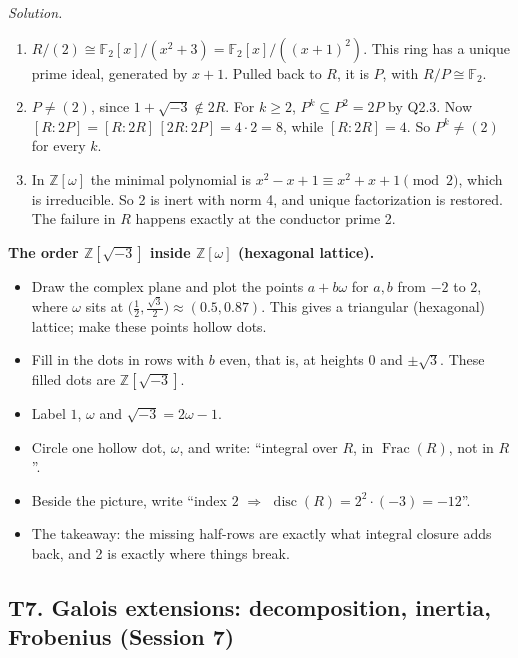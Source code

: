 \documentclass[11pt]{article}
\newcommand{\Z}{\mathbb{Z}}
\newcommand{\F}{\mathbb{F}}
\DeclareMathOperator{\disc}{disc}
\DeclareMathOperator{\Frac}{Frac}
\begin{document}
\begin{enumerate}[label=\textbf{Q6.\arabic*}]
  \textit{Solution.}
  \begin{enumerate}[label=(\alph*)]
    \item $R/(2)\cong\F_2[x]/(x^2+3)=\F_2[x]/((x+1)^2)$. This ring has a unique prime ideal, generated by $x+1$. Pulled back to $R$, it is $P$, with $R/P\cong\F_2$.
    \item $P\ne(2)$, since $1+\sqrt{-3}\notin 2R$. For $k\ge2$, $P^k\subseteq P^2=2P$ by Q2.3. Now $[R:2P]=[R:2R]\,[2R:2P]=4\cdot2=8$, while $[R:2R]=4$. So $P^k\neq(2)$ for every $k$.
    \item In $\Z[\omega]$ the minimal polynomial is $x^2-x+1\equiv x^2+x+1\pmod2$, which is irreducible. So 2 is inert with norm 4, and unique factorization is restored. The failure in $R$ happens exactly at the conductor prime 2.
  \end{enumerate}
\end{enumerate}

\begin{instructornote}
\textbf{The order $\Z[\sqrt{-3}]$ inside $\Z[\omega]$ (hexagonal lattice).}
\begin{itemize}
  \item Draw the complex plane and plot the points $a+b\omega$ for $a,b$ from $-2$ to $2$, where $\omega$ sits at $\bigl(\tfrac12,\tfrac{\sqrt3}{2}\bigr)\approx(0.5,0.87)$. This gives a triangular (hexagonal) lattice; make these points hollow dots.
  \item Fill in the dots in rows with $b$ even, that is, at heights $0$ and $\pm\sqrt3$. These filled dots are $\Z[\sqrt{-3}]$.
  \item Label $1$, $\omega$ and $\sqrt{-3}=2\omega-1$.
  \item Circle one hollow dot, $\omega$, and write: ``integral over $R$, in $\Frac(R)$, not in $R$''.
  \item Beside the picture, write ``index $2$ $\Rightarrow$ $\disc(R)=2^2\cdot(-3)=-12$''.
  \item The takeaway: the missing half-rows are exactly what integral closure adds back, and 2 is exactly where things break.
\end{itemize}
\end{instructornote}

\subsection{T7. Galois extensions: decomposition, inertia, Frobenius (Session 7)}
\end{document}
